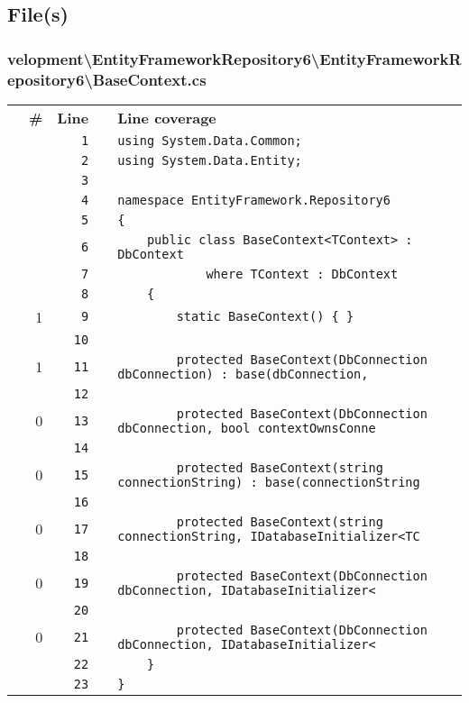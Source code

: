 \documentclass[a4paper,10pt]{article}
\begin{document}
\subsection{File(s)}
\subsubsection{velopment\textbackslash EntityFrameworkRepository6\textbackslash EntityFrameworkRepository6\textbackslash BaseContext.cs}
\begin{longtable}[l]{lrrll}
\textbf{} & \textbf{\#} & \textbf{Line} & \textbf{} & \textbf{Line coverage}\\
\cellcolor{gray} &  & \verb~1~ & & \verb~using System.Data.Common;~\\
\cellcolor{gray} &  & \verb~2~ & & \verb~using System.Data.Entity;~\\
\cellcolor{gray} &  & \verb~3~ & & \verb~~\\
\cellcolor{gray} &  & \verb~4~ & & \verb~namespace EntityFramework.Repository6~\\
\cellcolor{gray} &  & \verb~5~ & & \verb~{~\\
\cellcolor{gray} &  & \verb~6~ & & \verb~    public class BaseContext<TContext> : DbContext~\\
\cellcolor{gray} &  & \verb~7~ & & \verb~            where TContext : DbContext~\\
\cellcolor{gray} &  & \verb~8~ & & \verb~    {~\\
\cellcolor{green} & 1 & \verb~9~ & & \verb~        static BaseContext() { }~\\
\cellcolor{gray} &  & \verb~10~ & & \verb~~\\
\cellcolor{green} & 1 & \verb~11~ & & \verb~        protected BaseContext(DbConnection dbConnection) : base(dbConnection, ~\\
\cellcolor{gray} &  & \verb~12~ & & \verb~~\\
\cellcolor{red} & 0 & \verb~13~ & & \verb~        protected BaseContext(DbConnection dbConnection, bool contextOwnsConne~\\
\cellcolor{gray} &  & \verb~14~ & & \verb~~\\
\cellcolor{red} & 0 & \verb~15~ & & \verb~        protected BaseContext(string connectionString) : base(connectionString~\\
\cellcolor{gray} &  & \verb~16~ & & \verb~~\\
\cellcolor{red} & 0 & \verb~17~ & & \verb~        protected BaseContext(string connectionString, IDatabaseInitializer<TC~\\
\cellcolor{gray} &  & \verb~18~ & & \verb~~\\
\cellcolor{red} & 0 & \verb~19~ & & \verb~        protected BaseContext(DbConnection dbConnection, IDatabaseInitializer<~\\
\cellcolor{gray} &  & \verb~20~ & & \verb~~\\
\cellcolor{red} & 0 & \verb~21~ & & \verb~        protected BaseContext(DbConnection dbConnection, IDatabaseInitializer<~\\
\cellcolor{gray} &  & \verb~22~ & & \verb~    }~\\
\cellcolor{gray} &  & \verb~23~ & & \verb~}~\\
\end{longtable}
\newpage
\end{document}
